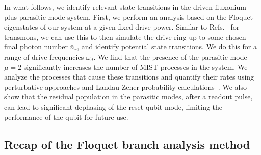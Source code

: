 \documentclass[%
reprint,
superscriptaddress,
 amsmath,amssymb,
 aps,
 prx,
longbibliography,
floatfix,
]{revtex4-2}
\begin{document}
In what follows, we identify relevant state transitions in the driven fluxonium plus parasitic mode system. First, we perform an analysis based on the Floquet eigenstates of our system at a given fixed drive power.  Similar to Refs.~\cite{khezri2023measurement,cohen2023reminiscence,dumas2024unified} for transmons, we can use this to then simulate the drive ring-up to some chosen final photon number $\bar{n}_r$, and identify potential state transitions.  We do this for a range of drive frequencies $\omega_d$. We find that the presence of the parasitic mode $\mu=2$ significantly increases the number of MIST processes in the system. We analyze the processes that cause these transitions and quantify their rates using perturbative approaches and Landau Zener probability calculations~\cite{ikeda2022floquet}. We also show that the residual population in the parasitic modes, after a readout pulse, can lead to significant dephasing of the reset qubit mode, limiting the performance of the qubit for future use.

\subsection{Recap of the Floquet branch analysis method} 
\end{document}
